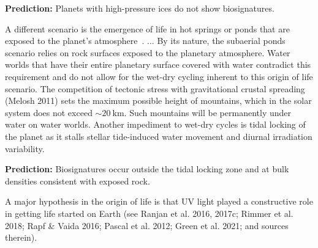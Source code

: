 \documentclass[modern,linenumbers]{aastex631}
\begin{document}
\textbf{Prediction:} Planets with high-pressure ices do not show biosignatures.

A different scenario is the emergence of life in hot springs or ponds that are exposed to the planet's atmosphere~\citep[e.g.,][]{Deamer2019}.
...
By its nature, the subaerial ponds scenario relies on rock surfaces exposed to the planetary atmosphere.
Water worlds that have their entire planetary surface covered with water contradict this requirement and do not allow for the wet-dry cycling inherent to this origin of life scenario.
The competition of tectonic stress with gravitational crustal spreading (Melosh 2011) sets the maximum possible height of mountains, which in the solar system does not exceed $\sim \SI{20}{\kilo\meter}$.
Such mountains will be permanently under water on water worlds.
Another impediment to wet-dry cycles is tidal locking of the planet as it stalls stellar tide-induced water movement and diurnal irradiation variability.

\textbf{Prediction:} Biosignatures occur outside the tidal locking zone and at bulk densities consistent with exposed rock.


A major hypothesis in the origin of life is that UV light played a constructive role in getting life started on Earth (see Ranjan et al. 2016, 2017c; Rimmer et al. 2018; Rapf \& Vaida 2016; Pascal et al. 2012; Green et al. 2021; and sources therein).
\end{document}
